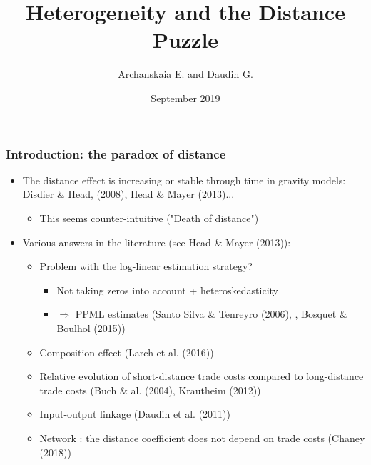 \documentclass{beamer}
\begin{document}
\title{Heterogeneity and the Distance Puzzle}  
\author[Archanskaia and Daudin]{Archanskaia E.\inst{*} and Daudin G.\inst{**}}
\date{September 2019
\\
\vspace{.3cm}
} 
\begin{frame}[plain]
\titlepage
\end{frame}

\begin{frame}[plain]\frametitle{Introduction: the paradox of distance}
\begin{itemize}
	\item The distance effect is increasing or stable through time in gravity models: Disdier  \&  Head, (2008), Head \& Mayer (2013)...
	\begin{itemize}
		\item This seems counter-intuitive ("Death of distance")
	\end{itemize}
	\item Various answers in the literature (see Head \& Mayer (2013)):
	\begin{itemize}
		\item Problem with the log-linear estimation strategy?
		\begin{itemize}
			\item Not taking zeros into account + heteroskedasticity 
			\item $\Rightarrow$ PPML estimates (Santo Silva \& Tenreyro (2006), , Bosquet \& Boulhol (2015))
		\end{itemize}
		\item Composition effect (Larch et al. (2016))
		\item Relative evolution of short-distance trade costs compared to long-distance trade costs (Buch \& al. (2004), Krautheim (2012))
		\item Input-output linkage (Daudin et al. (2011))
		\item Network : the distance coefficient does not depend on trade costs (Chaney (2018))
	\end{itemize}
\end{itemize}
\end{frame}
\end{document}
